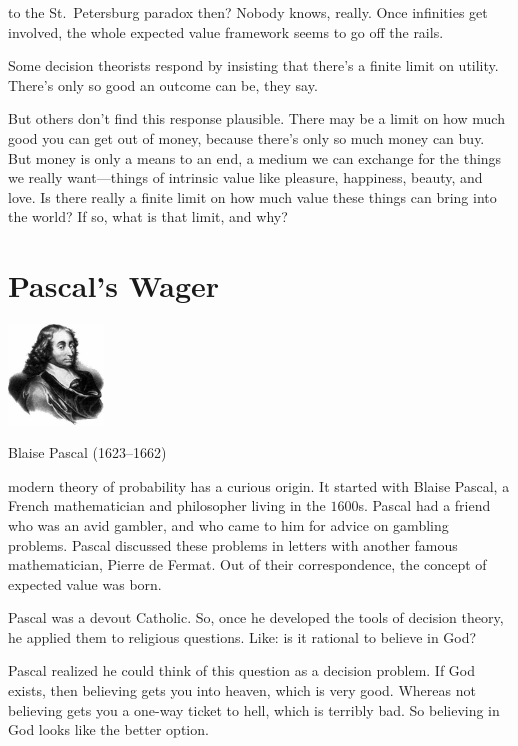 \documentclass[justified]{tufte-book}
\theoremstyle{definition}
\theoremstyle{definition}
\theoremstyle{definition}
\theoremstyle{remark}
\begin{document}
 to the St.~Petersburg paradox
then? Nobody knows, really. Once infinities get involved, the whole
expected value framework seems to go off the rails.

Some decision theorists respond by insisting that there's a finite limit
on utility. There's only so good an outcome can be, they say.

But others don't find this response plausible. There may be a limit on
how much good you can get out of money, because there's only so much
money can buy. But money is only a means to an end, a medium we can
exchange for the things we really want---things of intrinsic value like
pleasure, happiness, beauty, and love. Is there really a finite limit on
how much value these things can bring into the world? If so, what is
that limit, and why?

\hypertarget{pascals-wager}{%
\section{Pascal's Wager}\label{pascals-wager}}

\begin{marginfigure}
\includegraphics[width=1in]{img/pascal} \caption[Blaise Pascal (1623--1662)]{Blaise Pascal (1623--1662)}\label{fig:unnamed-chunk-118}
\end{marginfigure}

 modern theory of probability has a curious origin. It
started with Blaise Pascal, a French mathematician and philosopher
living in the \(1600\)s. Pascal had a friend who was an avid gambler,
and who came to him for advice on gambling problems. Pascal discussed
these problems in letters with another famous mathematician, Pierre de
Fermat. Out of their correspondence, the concept of expected value was
born.

Pascal was a devout Catholic. So, once he developed the tools of
decision theory, he applied them to religious questions. Like: is it
rational to believe in God?

Pascal realized he could think of this question as a decision problem.
If God exists, then believing gets you into heaven, which is very good.
Whereas not believing gets you a one-way ticket to hell, which is
terribly bad. So believing in God looks like the better option.
\end{document}
